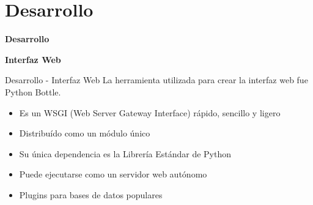 \section{Desarrollo}
\begin{frame}
    \Huge
    \centering
    \textbf{Desarrollo}

\end{frame}


\begin{frame}
    \Huge
    \centering
    \textbf{Interfaz Web}

\end{frame}

\begin{frame}{Desarrollo - Interfaz Web}
    \vspace{-1.5cm}
    La herramienta utilizada para crear la interfaz web fue Python Bottle.
    \begin{itemize}
        \item Es un WSGI (Web Server Gateway Interface) rápido, sencillo y ligero
        \item Distribuído como un módulo único
        \item Su única dependencia es la Librería Estándar de Python
        \item Puede ejecutarse como un servidor web autónomo
        \item Plugins para bases de datos populares
    \end{itemize}
    
\end{frame}

